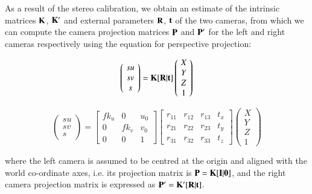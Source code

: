 As a result of the stereo calibration, we obtain an estimate of the intrinsic matrices $\mathbf{K}$, $\mathbf{K}'$ and external parameters $\mathbf{R}$, $\mathbf{t}$ of the two cameras, from which we can compute the camera projection matrices $\mathbf{P}$ and $\mathbf{P}'$ for the left and right cameras respectively using the equation for perspective projection:

\begin{equation*}
\label{qrdecomp}
	\left(\!
    \begin{array}{c}
      su \\
      sv \\
      s
    \end{array}
  	\!\right) =
  \mathbf{K}[\mathbf{R}|\mathbf{t}]
    \left(\!
    \begin{array}{c}
      X \\
      Y \\
      Z \\
      1
    \end{array}
    \!\right) 		 
\end{equation*}

\begin{equation*}
\left(\!
    \begin{array}{c}
      su \\
      sv \\
      s
    \end{array}
  	\!\right) =
  \begin{bmatrix}
       fk_u & 0 & u_0 \\[0.3em]
       0 & fk_v & v_0 \\[0.3em]
       0 & 0 & 1
  \end{bmatrix}
    \begin{bmatrix}
       r_{11} & r_{12} & r_{13} & t_x \\[0.3em]
       r_{21} & r_{22} & r_{23} & t_y \\[0.3em]
       r_{31} & r_{32} & r_{33} & t_z
  \end{bmatrix}
    \left(\!
    \begin{array}{c}
      X \\
      Y \\
      Z \\
      1
    \end{array}
    \!\right)
\end{equation*}

where the left camera is assumed to be centred at the origin and aligned with the world co-ordinate axes, i.e. its projection matrix is $\mathbf{P} = \mathbf{K} [\mathbf{I} | \mathbf{0}]$, and the right camera projection matrix is expressed as $\mathbf{P}' = \mathbf{K}' [\mathbf{R} | \mathbf{t}]$.

